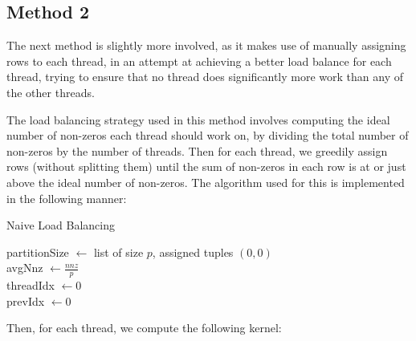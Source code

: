\documentclass{article}
\begin{document}
    \subsection{Method 2}
    The next method is slightly more involved, as it makes use of manually assigning rows to each thread, in an attempt at achieving a better load balance for each thread, trying to ensure that no thread does significantly more work than any of the other threads.
    \medskip

    The load balancing strategy used in this method involves computing the ideal number of non-zeros each thread should work on, by dividing the total number of non-zeros by the number of threads. Then for each thread, we greedily assign rows (without splitting them) until the sum of non-zeros in each row is at or just above the ideal number of non-zeros. The algorithm used for this is implemented in the following manner:
    \medskip

    \begin{algorithm}[H]
        \caption{Naive Load Balancing}
        \SetAlgoVlined

        partitionSize \( \leftarrow \) list of size \( p \), assigned tuples \( \left( 0,0 \right) \)\\
        avgNnz \( \leftarrow \frac{nnz}{p} \)\\
        threadIdx \( \leftarrow 0 \)\\
        prevIdx \( \leftarrow 0 \)\\

    \end{algorithm}

    Then, for each thread, we compute the following kernel:
    \medskip
\end{document}
